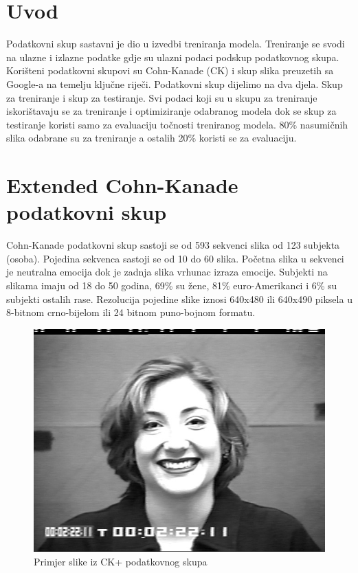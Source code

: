 \documentclass[times, utf8, zavrsni,numeric,pstricks]{fer}
\begin{document}
\section{Uvod}
Podatkovni skup sastavni je dio u izvedbi treniranja modela. Treniranje se svodi na ulazne i izlazne podatke gdje su ulazni podaci podskup podatkovnog skupa. Korišteni podatkovni skupovi su Cohn-Kanade (CK) i skup slika preuzetih sa Google-a na temelju ključne riječi. Podatkovni skup dijelimo na dva djela. Skup za treniranje i skup za testiranje. Svi podaci koji su u skupu za treniranje iskorištavaju se za treniranje i optimiziranje odabranog modela dok se skup za testiranje koristi samo za evaluaciju točnosti treniranog modela. 80\% nasumičnih slika odabrane su za treniranje a ostalih 20\% koristi se za evaluaciju.

\section{Extended Cohn-Kanade podatkovni skup}

Cohn-Kanade podatkovni skup sastoji se od 593 sekvenci slika od 123 subjekta (osoba). Pojedina sekvenca sastoji se od 10 do 60 slika. Početna slika u sekvenci je neutralna emocija dok je zadnja slika vrhunac izraza emocije. Subjekti na slikama imaju od 18 do 50 godina, 69\% su žene, 81\% euro-Amerikanci i 6\% su subjekti ostalih rase. Rezolucija pojedine slike iznosi 640x480 ili 640x490 piksela u 8-bitnom crno-bijelom ili 24 bitnom puno-bojnom formatu\cite{ck}.

\begin{figure}[H]
	\centering
	\includegraphics[width=\linewidth, height=0.3\paperheight, keepaspectratio]{ck_example.png}
	\caption{Primjer slike iz CK+ podatkovnog skupa}
	\label{pic:ck_example}
\end{figure}
\end{document}
